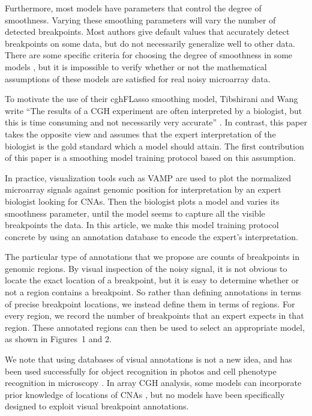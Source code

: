 \documentclass[10pt]{bmc_article}
\newcommand{\citep}[1]{\cite{#1}}
\newenvironment{bmcformat}{\begin{raggedright}\baselineskip20pt\sloppy\setboolean{publ}{false}}{\end{raggedright}\baselineskip20pt\sloppy}
\begin{document}
\begin{bmcformat}
Furthermore, most models have parameters that control the degree of
smoothness. Varying these smoothing parameters will vary the number of
detected breakpoints. Most authors give default values that accurately
detect breakpoints on some data, but do not necessarily generalize
well to other data. There are some specific criteria for choosing the
degree of smoothness in some models
\citep{lavielle2005,mBIC,penalized-cna}, but it is impossible to
verify whether or not the mathematical assumptions of these models are
satisfied for real noisy microarray data.

To motivate the use of their cghFLasso smoothing model,
Tibshirani and Wang write ``The results of a CGH experiment are often
interpreted by a biologist, but this is time consuming and not
necessarily very accurate'' \cite{cghFLasso}.
In contrast, this paper takes the opposite view and assumes that the
expert interpretation of the biologist is the gold standard which a
model should attain. The first contribution of this paper is a
smoothing model training protocol based on this assumption.

In practice, visualization tools such as VAMP \citep{vamp} are used to
plot the normalized microarray signals against genomic position for
interpretation by an expert biologist looking for CNAs. Then the
biologist plots a model and varies its smoothness parameter, until the
model seems to capture all the visible breakpoints the data. In this
article, we make this model training protocol concrete by using an
annotation database to encode the expert's interpretation.

The particular type of annotations that we propose are counts of
breakpoints in genomic regions. By visual inspection of the noisy
signal, it is not obvious to locate the exact location of a
breakpoint, but it is easy to determine whether or not a region
contains a breakpoint. So rather than defining annotations in terms of
precise breakpoint locations, we instead define them in terms of
regions. For every region, we record the number of breakpoints that an
expert expects in that region. These annotated regions can then be
used to select an appropriate model, as shown in Figures~1 and 2.

We note that using databases of visual annotations is not a new idea,
and has been used successfully for object recognition in photos and
cell phenotype recognition in microscopy
\citep{labelme,cellprofiler}. In array CGH analysis, some models can
incorporate prior knowledge of locations of CNAs \cite{shah}, but no
models have been specifically designed to exploit visual breakpoint
annotations.


\end{bmcformat}
\end{document}
